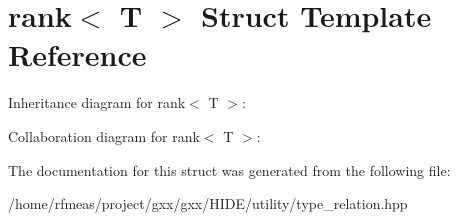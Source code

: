 \hypertarget{structrank}{}\section{rank$<$ T $>$ Struct Template Reference}
\label{structrank}


Inheritance diagram for rank$<$ T $>$\+:


Collaboration diagram for rank$<$ T $>$\+:


The documentation for this struct was generated from the following file\+:\begin{DoxyCompactItemize}
\item 
/home/rfmeas/project/gxx/gxx/\+H\+I\+D\+E/utility/type\+\_\+relation.\+hpp\end{DoxyCompactItemize}
